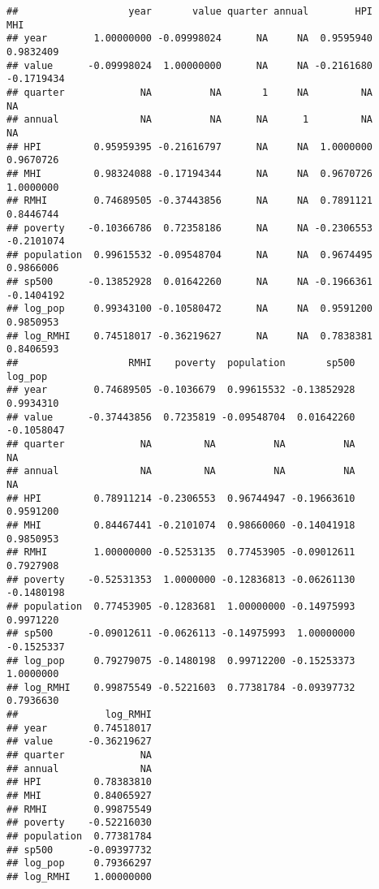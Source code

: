 \documentclass[
]{article}
\newenvironment{Shaded}{\begin{snugshade}}{\end{snugshade}}
\newcommand{\DataTypeTok}[1]{\textcolor[rgb]{0.13,0.29,0.53}{#1}}
\newcommand{\DecValTok}[1]{\textcolor[rgb]{0.00,0.00,0.81}{#1}}
\newcommand{\KeywordTok}[1]{\textcolor[rgb]{0.13,0.29,0.53}{\textbf{#1}}}
\newcommand{\NormalTok}[1]{#1}
\newcommand{\OperatorTok}[1]{\textcolor[rgb]{0.81,0.36,0.00}{\textbf{#1}}}
\newcommand{\StringTok}[1]{\textcolor[rgb]{0.31,0.60,0.02}{#1}}
\begin{document}
\begin{verbatim}
##                   year       value quarter annual        HPI        MHI
## year        1.00000000 -0.09998024      NA     NA  0.9595940  0.9832409
## value      -0.09998024  1.00000000      NA     NA -0.2161680 -0.1719434
## quarter             NA          NA       1     NA         NA         NA
## annual              NA          NA      NA      1         NA         NA
## HPI         0.95959395 -0.21616797      NA     NA  1.0000000  0.9670726
## MHI         0.98324088 -0.17194344      NA     NA  0.9670726  1.0000000
## RMHI        0.74689505 -0.37443856      NA     NA  0.7891121  0.8446744
## poverty    -0.10366786  0.72358186      NA     NA -0.2306553 -0.2101074
## population  0.99615532 -0.09548704      NA     NA  0.9674495  0.9866006
## sp500      -0.13852928  0.01642260      NA     NA -0.1966361 -0.1404192
## log_pop     0.99343100 -0.10580472      NA     NA  0.9591200  0.9850953
## log_RMHI    0.74518017 -0.36219627      NA     NA  0.7838381  0.8406593
##                   RMHI    poverty  population       sp500    log_pop
## year        0.74689505 -0.1036679  0.99615532 -0.13852928  0.9934310
## value      -0.37443856  0.7235819 -0.09548704  0.01642260 -0.1058047
## quarter             NA         NA          NA          NA         NA
## annual              NA         NA          NA          NA         NA
## HPI         0.78911214 -0.2306553  0.96744947 -0.19663610  0.9591200
## MHI         0.84467441 -0.2101074  0.98660060 -0.14041918  0.9850953
## RMHI        1.00000000 -0.5253135  0.77453905 -0.09012611  0.7927908
## poverty    -0.52531353  1.0000000 -0.12836813 -0.06261130 -0.1480198
## population  0.77453905 -0.1283681  1.00000000 -0.14975993  0.9971220
## sp500      -0.09012611 -0.0626113 -0.14975993  1.00000000 -0.1525337
## log_pop     0.79279075 -0.1480198  0.99712200 -0.15253373  1.0000000
## log_RMHI    0.99875549 -0.5221603  0.77381784 -0.09397732  0.7936630
##               log_RMHI
## year        0.74518017
## value      -0.36219627
## quarter             NA
## annual              NA
## HPI         0.78383810
## MHI         0.84065927
## RMHI        0.99875549
## poverty    -0.52216030
## population  0.77381784
## sp500      -0.09397732
## log_pop     0.79366297
## log_RMHI    1.00000000
\end{verbatim}

\begin{Shaded}
\end{Shaded}
\end{document}
